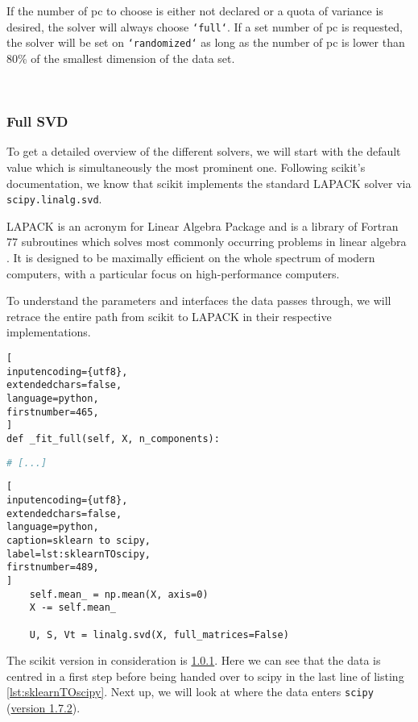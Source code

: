 If the number of \gls{pc} to choose is either not declared or a quota of variance is desired, the solver will always choose \texttt{`full`}.
If a set number of \gls{pc} is requested, the solver will be set on \texttt{`randomized`} as long as the number of \gls{pc} is lower than 80\% of the smallest dimension of the data set.


\ \clearpage


\subsubsection{Full SVD} \label{sec:fullSVD}

To get a detailed overview of the different solvers, we will start with the default value which is simultaneously the most prominent one.
Following \gls{scikit}'s documentation, we know that \gls{scikit} implements the standard LAPACK solver via \texttt{scipy.linalg.svd}.
\bigskip

LAPACK is an acronym for Linear Algebra Package and is a library of Fortran 77 subroutines which solves most commonly occurring problems in linear algebra \cite{anderson1999lapack}.
It is designed to be maximally efficient on the whole spectrum of modern computers, with a particular focus on high-performance computers.

To understand the parameters and interfaces the data passes through, we will retrace the entire path from \gls{scikit} to LAPACK in their respective implementations.


\begin{lstlisting}[
inputencoding={utf8}, 
extendedchars=false, 
language=python,
firstnumber=465,
]
def _fit_full(self, X, n_components):
\end{lstlisting}
%
%
%
\spacingConcatLists
\begin{lstlisting}[language=python, numbers=none]
     # [...]
\end{lstlisting}
%
%
%
\spacingConcatLists
\begin{lstlisting}[
inputencoding={utf8}, 
extendedchars=false, 
language=python, 
caption=sklearn to scipy, 
label=lst:sklearnTOscipy,
firstnumber=489,
]
    self.mean_ = np.mean(X, axis=0)
    X -= self.mean_

    U, S, Vt = linalg.svd(X, full_matrices=False)
\end{lstlisting}



\noindent
The \gls{scikit} version in consideration is \href{\scikitPCAvIxOxI{_pca}}{1.0.1}.
Here we can see that the data is centred in a first step before being handed over to scipy in the last line of listing \ref{lst:sklearnTOscipy}.
Next up, we will look at where the data enters \texttt{scipy} (\href{\scipyvIxVIIxII{decomp_svd}}{version 1.7.2}).



